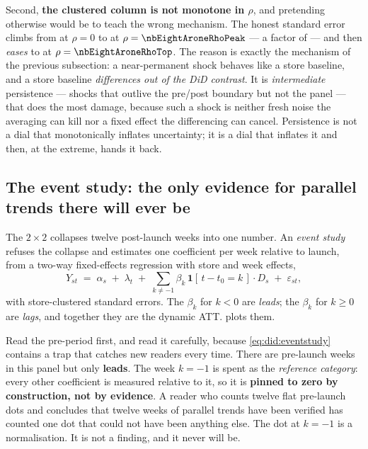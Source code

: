 Second, \textbf{the clustered column is not monotone in $\rho$}, and pretending otherwise would be
to teach the wrong mechanism. The honest standard error climbs from \eur{\nbEightAroneSeZero} at
$\rho = 0$ to \eur{\nbEightAroneSePeak} at $\rho = \nbEightAroneRhoPeak$ --- a factor of
\nbEightAroneSeGrowth{} --- and then \emph{eases} to \eur{\nbEightAroneSeTop} at
$\rho = \nbEightAroneRhoTop$. The reason is exactly the mechanism of the previous subsection: a
near-permanent shock behaves like a store baseline, and a store baseline \emph{differences out of
the DiD contrast}. It is \emph{intermediate} persistence --- shocks that outlive the pre/post
boundary but not the panel --- that does the most damage, because such a shock is neither fresh
noise the averaging can kill nor a fixed effect the differencing can cancel. Persistence is not a
dial that monotonically inflates uncertainty; it is a dial that inflates it and then, at the
extreme, hands it back.

\subsection*{The event study: the only evidence for parallel trends there will ever be}

The $2 \times 2$ collapses twelve post-launch weeks into one number. An \emph{event study} refuses
the collapse and estimates one coefficient per week relative to launch, from a two-way
fixed-effects regression with store and week effects,
%
\begin{equation}
  Y_{st}
  \;=\;
  \alpha_s \;+\; \lambda_t
  \;+\; \sum_{k \ne -1} \beta_k \, \mathbf 1[\,t - t_0 = k\,] \cdot D_s
  \;+\; \varepsilon_{st},
  \label{eq:did:eventstudy}
\end{equation}
%
with store-clustered standard errors. The $\beta_k$ for $k < 0$ are \emph{leads}; the $\beta_k$ for
$k \ge 0$ are \emph{lags}, and together they are the dynamic ATT.  plots
them.



Read the pre-period first, and read it carefully, because \cref{eq:did:eventstudy} contains a trap
that catches new readers every time. There are \nbEightEsNPre{} pre-launch weeks in this panel but
only \textbf{\nbEightEsNLeads{} leads}. The week $k = -1$ is spent as the \emph{reference category}:
every other coefficient is measured relative to it, so it is \textbf{pinned to zero by
construction, not by evidence}. A reader who counts twelve flat pre-launch dots and concludes that
twelve weeks of parallel trends have been verified has counted one dot that could not have been
anything else. The dot at $k = -1$ is a normalisation. It is not a finding, and it never will be.

